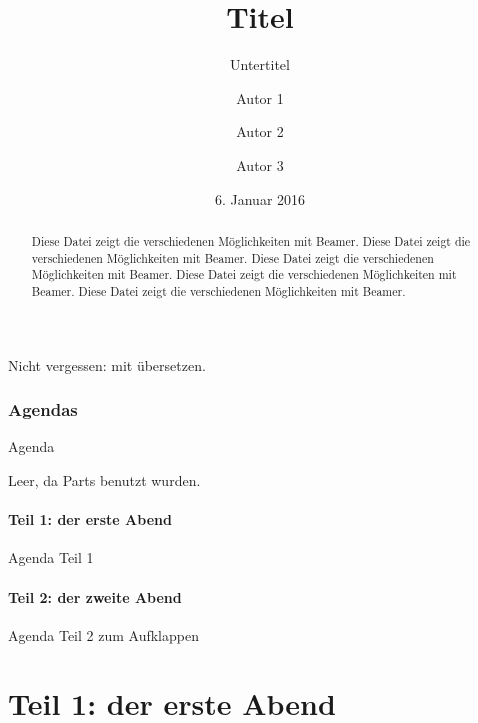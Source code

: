 \documentclass[ngerman]{scrartcl}
\title{Titel}
\subtitle{Untertitel}
\author{Autor 1 \and Autor 2 \and Autor 3}
\date{6. Januar 2016}
\begin{document}




	\frame{\titlepage}

	\begin{frame}
		Nicht vergessen: mit  übersetzen.
	\end{frame}

	\begin{frame}
		\begin{abstract}
			Diese Datei zeigt die verschiedenen Möglichkeiten mit Beamer.
			Diese Datei zeigt die verschiedenen Möglichkeiten mit Beamer.
			Diese Datei zeigt die verschiedenen Möglichkeiten mit Beamer.
			Diese Datei zeigt die verschiedenen Möglichkeiten mit Beamer.
			Diese Datei zeigt die verschiedenen Möglichkeiten mit Beamer.
		\end{abstract}
	\end{frame}

	\section*{Agendas}

	\begin{frame}{Agenda}
		\tableofcontents

		Leer, da Parts benutzt wurden.
	\end{frame}

	\subsection*{Teil 1: der erste Abend}

	\begin{frame}{Agenda Teil 1}
		\tableofcontents[part=1, subsectionstyle=hide]
	\end{frame}

	\subsection*{Teil 2: der zweite Abend}

	\begin{frame}{Agenda Teil 2 zum Aufklappen}
		\tableofcontents[part=2, pausesections]
	\end{frame}





	\part{Teil 1: der erste Abend}
\end{document}
